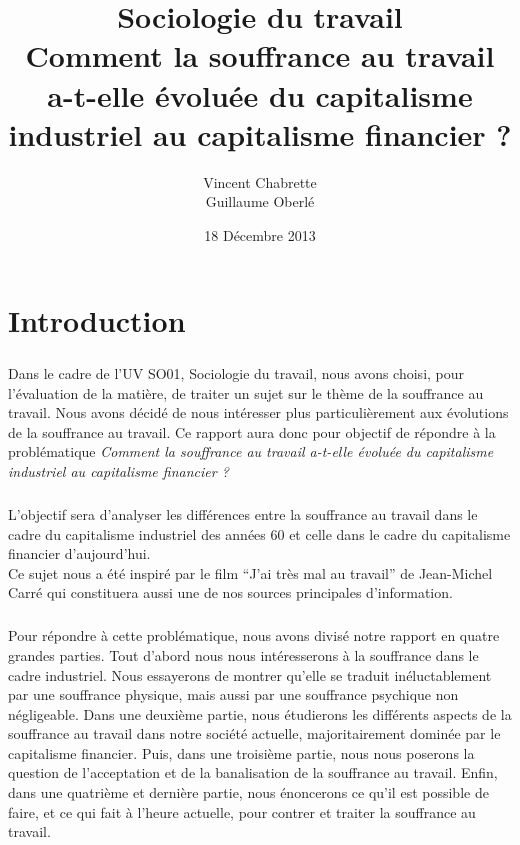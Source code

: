 \documentclass{report}
\title{Sociologie du travail\\Comment la souffrance au travail a-t-elle évoluée du capitalisme industriel au capitalisme financier ?}
\author{Vincent Chabrette\\Guillaume Oberlé}
\date{18 Décembre 2013}
\begin{document}

\maketitle
\tableofcontents

\chapter*{Introduction}
	\paragraph{}
		Dans le cadre de l'UV SO01, Sociologie du travail, nous avons choisi, pour l'évaluation de la matière, de traiter un sujet sur le thème de la souffrance au travail. Nous avons décidé de nous intéresser plus particulièrement aux évolutions de la souffrance au travail. Ce rapport aura donc pour objectif de répondre à la problématique \textit{Comment la souffrance au travail a-t-elle évoluée du capitalisme industriel au capitalisme financier ?}

	\paragraph{}
		L’objectif sera d’analyser les différences entre la souffrance au travail dans le cadre du capitalisme industriel des années 60 et celle dans le cadre du capitalisme financier d’aujourd’hui. \\Ce sujet nous a été inspiré par le film ``J’ai très mal au travail'' de Jean-Michel Carré qui constituera aussi une de nos sources principales d’information.

	\paragraph{}
		Pour répondre à cette problématique, nous avons divisé notre rapport en quatre grandes parties. Tout d'abord nous nous intéresserons à la souffrance dans le cadre industriel. Nous essayerons de montrer qu'elle se traduit inéluctablement par une souffrance physique, mais aussi par une souffrance psychique non négligeable. Dans une deuxième partie, nous étudierons les différents aspects de la souffrance au travail dans notre société actuelle, majoritairement dominée par le capitalisme financier. Puis, dans une troisième partie, nous nous poserons la question de l'acceptation et de la banalisation de la souffrance au travail. Enfin, dans une quatrième et dernière partie, nous énoncerons ce qu'il est possible de faire, et ce qui fait à l'heure actuelle, pour contrer et traiter la souffrance au travail.
\end{document}
